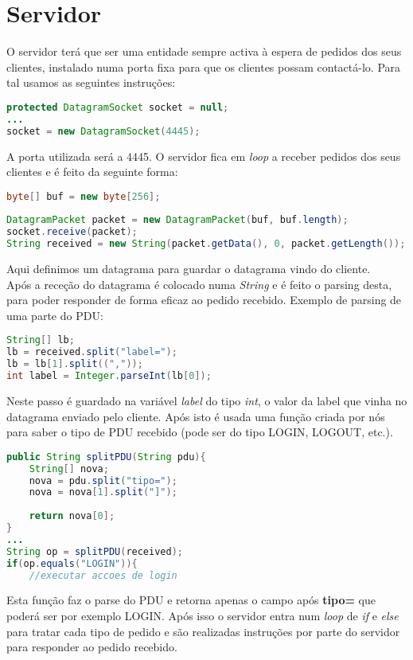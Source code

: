 \documentclass{report}
\begin{document}
\section{Servidor}\label{servidor}
O servidor terá que ser uma entidade sempre activa à espera de pedidos dos seus clientes, instalado numa porta fixa para que os clientes possam contactá-lo. Para tal usamos as seguintes instruções: 
\begin{lstlisting}[language=Java]
protected DatagramSocket socket = null;
...
socket = new DatagramSocket(4445);
\end{lstlisting}
A porta utilizada será a 4445. O servidor fica em \textit{loop} a receber pedidos dos seus clientes e é feito da seguinte forma:
\begin{lstlisting}[language=Java]
byte[] buf = new byte[256];
 
DatagramPacket packet = new DatagramPacket(buf, buf.length);
socket.receive(packet);
String received = new String(packet.getData(), 0, packet.getLength());
\end{lstlisting}
Aqui definimos um datagrama para guardar o datagrama vindo do cliente. \\ Após a receção do datagrama é colocado numa \textit{String} e é feito o parsing desta, para poder responder de forma eficaz ao pedido recebido.
Exemplo de parsing de uma parte do PDU:
\begin{lstlisting}[language=Java]
String[] lb;
lb = received.split("label=");
lb = lb[1].split((","));
int label = Integer.parseInt(lb[0]);
\end{lstlisting}
Neste passo é guardado na variável \textit{label} do tipo \textit{int}, o valor da label que vinha no datagrama enviado pelo cliente. Após isto é usada uma função criada por nós para saber o tipo de PDU recebido (pode ser do tipo LOGIN, LOGOUT, etc.).

\begin{lstlisting}[language=Java]
public String splitPDU(String pdu){
    String[] nova;
    nova = pdu.split("tipo=");
    nova = nova[1].split("]");
        
    return nova[0];
}
...
String op = splitPDU(received);
if(op.equals("LOGIN")){ 
    //executar accoes de login
\end{lstlisting}
Esta função faz o parse do PDU e retorna apenas o campo após \textbf{tipo=} que poderá ser por exemplo LOGIN. Após isso o servidor entra num \textit{loop} de \textit{if} e \textit{else} para tratar cada tipo de pedido e são realizadas instruções por parte do servidor para responder ao pedido recebido.
\end{document}
